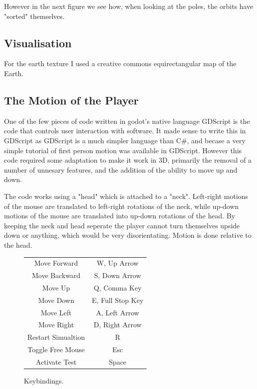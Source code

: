 \documentclass[12pt]{article}
\begin{document}
However in the next figure we see how, when looking at the poles, the orbits have "sorted" themselves.


\subsection{Visualisation}

For the earth texture I used a creative commons equirectangular map of the Earth. \cite{Map}

\subsection{The Motion of the Player}

One of the few pieces of code written in godot's native language GDScript is the code that controls user interaction with software. It made sense to write this in GDScript as GDScript is a much simpler language than C\#, and becase a very simple tutorial of first person motion was available in GDScript\cite{FirstPersonMotion}. However this code required some adaptation to make it work in 3D, primarily the removal of a number of unnesary features, and the addition of the ability to move up and down.

The code works using a "head" which is attached to a "neck". Left-right motions of the mouse are translated to left-right rotations of the neck, while up-down motions of the mouse are translated into up-down rotations of the head. By keeping the neck and head seperate the player cannot turn themselves upside down or anything, which would be very disorientating. Motion is done relative to the head.

\begin{figure}
\begin{center}
\label{fig:Keybindings}
\caption{Keybindings.}
\begin{tabular}{ | c | c  | }
	\hline
	Move Forward & W, Up Arrow \\
	Move Backward & S, Down Arrow\\
	Move Up & Q, Comma Key\\
	Move Down & E, Full Stop Key\\
	Move Left & A, Left Arrow \\
	Move Right & D, Right Arrow \\
	Restart Simualtion & R \\
	Toggle Free Mouse & Esc \\
	Activate Test & Space \\
	\hline
\end{tabular}
\end{center}
\end{figure}
\end{document}
